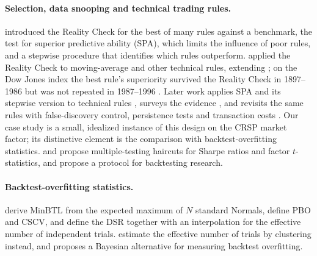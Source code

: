 \documentclass[11pt,a4paper]{article}
\begin{document}
\paragraph{Selection, data snooping and technical trading rules.} \citet{white2000} introduced the Reality Check for the best of many rules against a benchmark, \citet{hansen2005} the test for superior predictive ability (SPA), which limits the influence of poor rules, and \citet{romano2005} a stepwise procedure that identifies which rules outperform. \citet{sullivan1999} applied the Reality Check to moving-average and other technical rules, extending \citet{brock1992}; on the Dow Jones index the best rule's superiority survived the Reality Check in 1897--1986 but was not repeated in 1987--1996 \citep[p.~1683]{sullivan1999}. Later work applies SPA and its stepwise version to technical rules \citep{hsu2005,hsu2010}, surveys the evidence \citep{park2007}, and revisits the same rules with false-discovery control, persistence tests and transaction costs \citep{bajgrowicz2012}. Our case study is a small, idealized instance of this design on the CRSP market factor; its distinctive element is the comparison with backtest-overfitting statistics. \citet{harvey2014evaluating,harvey2015backtesting} and \citet{harvey2016cross} propose multiple-testing haircuts for Sharpe ratios and factor $t$-statistics, and \citet{arnott2019} propose a protocol for backtesting research.

\paragraph{Backtest-overfitting statistics.} \citet{bailey2014pseudo} derive MinBTL from the expected maximum of $N$ standard Normals, \citet{bailey2017pbo} define PBO and CSCV, and \citet{bailey2014dsr} define the DSR together with an interpolation for the effective number of independent trials. \citet{lopezdeprado2018lewis} estimate the effective number of trials by clustering instead, and \citet{witzany2021} proposes a Bayesian alternative for measuring backtest overfitting.
\end{document}
